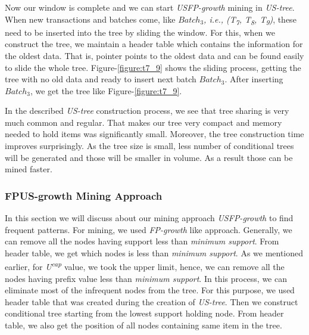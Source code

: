 \documentclass[conference]{IEEEtran}
\begin{document}
Now our window is complete and we can start \emph{USFP-growth} mining in \emph {US-tree}. When new transactions and batches come, like \emph{$Batch_{3}$, i.e., (T\textsubscript{7}, T\textsubscript{8}, T\textsubscript{9})}, these need to be inserted into the tree by sliding the window. For this, when we construct the tree, we maintain a header table which contains the information for the oldest data. That is, pointer points to the oldest data and can be found easily to slide the whole tree. Figure-\ref{figure:t7_9} shows the sliding process, getting the tree with no old data and ready to insert next batch \emph{$Batch_{3}$}. After inserting \emph{$Batch_{3}$}, we get the tree like Figure-\ref{figure:t7_9}.
  
In the described \emph{US-tree} construction process, we see that tree sharing is very much common and regular. That makes our tree very compact and memory needed to hold items was significantly small. Moreover, the tree construction time improves surprisingly. As the tree size is small, less number of conditional trees will be generated and those will be smaller in volume. As a result those can be mined faster.

\subsubsection{FPUS-growth Mining Approach}
In this section we will discuss about our mining approach \emph{USFP-growth} to find frequent patterns. For mining, we used \emph{FP-growth} like approach. Generally, we can remove all the nodes having support less than \emph{minimum support}. From header table, we get which nodes is less than \emph{minimum support}. As we mentioned earlier, for \emph{U\textsuperscript{cap}} value, we took the upper limit, hence, we can remove all the nodes having prefix value less than \emph{minimum support}. In this process, we can eliminate most of the infrequent nodes from the tree. For this purpose, we used header table that was created during the creation of \emph{US-tree}. Then we construct conditional tree starting from the lowest support holding node. From header table, we also get the position of all nodes containing same item in the tree.
\end{document}
